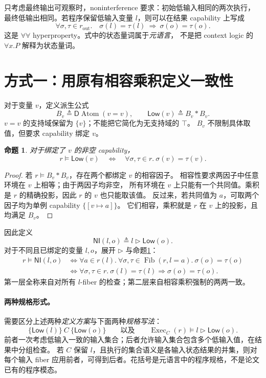 \documentclass[UTF8,a4paper,11pt,fontset=fandol]{ctexart}
\newcommand{\Atom}{\operatorname{Atom}}
\newcommand{\Low}{\mathsf{Low}}
\newcommand{\NI}{\mathsf{NI}}
\newcommand{\Fib}{\operatorname{Fib}}
\newcommand{\Exec}{\operatorname{Exec}}
\newcommand{\D}{\mathsf{D}}
\newcommand{\sat}{\models}
\newcommand{\eqv}{\Longleftrightarrow}
\newtheorem{proposition}{命题}
\begin{document}
只考虑最终输出可观察时，noninterference 要求：初始低输入相同的两次执行，
最终低输出相同。若程序保留低输入变量 $l$，则可以在结果 capability 上写成
\begin{equation}\label{eq:ni-sem}
 \forall\sigma,\tau\in r_{\mathrm{out}}.\quad
 \sigma(l)=\tau(l)\ \Longrightarrow\ \sigma(o)=\tau(o).
\end{equation}
这是 $\forall\forall$ hyperproperty。式中的状态量词属于\emph{元语言}，
不是把 context logic 的 $\forall x.P$ 解释为状态量词。

\section{方式一：用原有相容乘积定义一致性}

对于变量 $v$，定义派生公式
\[
 B_v\triangleq\D\Atom(v=v),\qquad
 \boxed{\Low(v)\triangleq B_v*B_v.}
\]
$v=v$ 的支持域保留为 $\{v\}$；不能把它简化为无支持域的 $\top$。
$B_v$ 不限制具体取值，但要求 capability 绑定 $v$。

\begin{proposition}\label{prop:low}
对于绑定了 $v$ 的非空 capability，
\[
 r\sat\Low(v)\quad\eqv\quad
 \forall\sigma,\tau\in r.\ \sigma(v)=\tau(v).
\]
\end{proposition}
\begin{proof}
若 $r\sat B_v*B_v$，存在两个都绑定 $v$ 的相容因子。
相容性要求两因子中任意环境在 $v$ 上相等；由于两因子均非空，
所有环境在 $v$ 上只能有一个共同值。乘积是 $r$ 的精确投影，因此 $r$ 的 $v$ 也只能取该值。
反过来，若共同值为 $a$，可取两个因子均为单例 capability $\{[v\mapsto a]\}$。
它们相容，乘积就是 $r$ 在 $v$ 上的投影，且均满足 $B_v$。
\end{proof}

因此定义
\[
 \boxed{\NI(l,o)\triangleq l\triangleright\Low(o).}
\]
对于不同且已绑定的变量 $l,o$，展开 $\triangleright$ 与命题\ref{prop:low}：
\begin{align*}
 r\sat\NI(l,o)
 &\eqv\forall a\in r(l).\
    \forall\sigma,\tau\in\Fib(r,l=a).\ \sigma(o)=\tau(o)\\
 &\eqv\forall\sigma,\tau\in r.\
    \sigma(l)=\tau(l)\Longrightarrow\sigma(o)=\tau(o).
\end{align*}
第一层全称来自对所有 $l$-fiber 的检查；第二层来自相容乘积强制的两两一致。

\paragraph{两种规格形式。}
需要区分上述两种\emph{定义方案}与下面两种\emph{规格写法}：
\[
 \{\Low(l)\}\ C\ \{\Low(o)\}
 \qquad\text{以及}\qquad
 \Exec_C(r)\sat l\triangleright\Low(o).
\]
前者一次考虑低输入一致的输入集合；后者允许输入集合包含多个低输入值，在结果中分组检查。
若 $C$ 保留 $l$，且执行的集合语义是各输入状态结果的并集，则对每个输入 fiber
应用前者，可得到后者。花括号是元语言中的程序规格，不是论文已有的程序模态。
\end{document}
